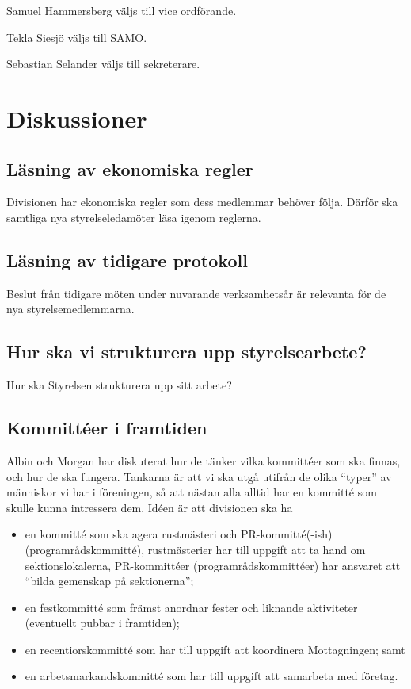 \documentclass[protokoll]{dvd}
\begin{document}
\begin{attsatser}
    \item Samuel Hammersberg väljs till vice ordförande.
    \item Tekla Siesjö väljs till SAMO.
    \item Sebastian Selander väljs till sekreterare.
\end{attsatser}

\section{Diskussioner}\label{sec:discussioner}

\subsection{Läsning av ekonomiska regler}

Divisionen har ekonomiska regler som dess medlemmar behöver följa.
Därför ska samtliga nya styrelseledamöter läsa igenom reglerna.

\subsection{Läsning av tidigare protokoll}

Beslut från tidigare möten under nuvarande verksamhetsår är relevanta för de nya styrelsemedlemmarna.

\subsection{Hur ska vi strukturera upp styrelsearbete?}

Hur ska Styrelsen strukturera upp sitt arbete?

\subsection{Kommittéer i framtiden}

Albin och Morgan har diskuterat hur de tänker vilka kommittéer som ska finnas, och hur de ska fungera.
Tankarna är att vi ska utgå utifrån de olika ``typer'' av människor vi har i föreningen, så att nästan alla alltid har en kommitté som skulle kunna intressera dem.
Idéen är att divisionen ska ha
\begin{itemize}
    \item en kommitté som ska agera rustmästeri och PR-kommitté(-ish) (programrådskommitté), rustmästerier har till uppgift att ta hand om sektionslokalerna, PR-kommittéer (programrådskommittéer) har ansvaret att ``bilda gemenskap på sektionerna'';

    \item en festkommitté som främst anordnar fester och liknande aktiviteter (eventuellt pubbar i framtiden);

    \item en recentiorskommitté som har till uppgift att koordinera Mottagningen; samt

    \item en arbetsmarkandskommitté som har till uppgift att samarbeta med företag.
\end{itemize}
\end{document}
